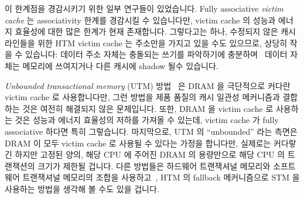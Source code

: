 이 한계점을 경감시키기 위한 일부 연구들이 있었습니다.
Fully associative \emph{victim cache} 는 associativity 한계를 경감시킬 수
있습니다만, victim cache 의 성능과 에너지 효율성에 대한 많은 한계가 현재
존재합니다.
그렇다고는 하나, 수정되지 않은 캐시 라인들을 위한 HTM victim cache 는 주소만을
가지고 있을 수도 있으므로, 상당히 작을 수 있습니다:
데이터 주소 자체는 충돌되는 쓰기를 파악하기에 충분하며~\cite{RaviRajwar2012TSX}
데이터 자체는 메모리에 쓰여지거나 다른 캐시에 shadow 될수 있습니다.
\iffalse

Although cache associativity varies, the eight-way associativity of
the level-0 cache on the laptop I am typing this on is not unusual.
What this means is that if a given transaction needed to touch
nine cache lines, and if all nine cache lines mapped to the same
set, then that transaction cannot possibly complete, never mind how
many megabytes of additional space might be available in that cache.
Yes, given randomly selected data elements in a given data structure,
the probability of that transaction being able to commit is quite
high, but there can be no guarantee.

There has been some research work to alleviate this limitation.
Fully associative \emph{victim caches} would alleviate the associativity
constraints, but there are currently stringent performance and
energy-efficiency constraints on the sizes of victim caches.
That said, HTM victim caches for unmodified cache lines can be quite
small, as they need to retain only the address:
The data itself can be written to memory or shadowed by other caches,
while the address itself is sufficient to detect a conflicting
write~\cite{RaviRajwar2012TSX}.
\fi

\emph{Unbounded transactional memory} (UTM)
방법~\cite{CScottAnanian2006,KevinEMoore2006} 은 DRAM 을 극단적으로 커다란
victim cache 로 사용합니다만, 그런 방법을 제품 품질의 캐시 일관성 메커니즘과
결합하는 것은 여전히 해결되지 않은 문제입니다.
또한, DRAM 을 victim cache 로 사용하는 것은 성능과 에너지 효율성의 저하를
가져올 수 있는데, victim cache 가 fully associative 하다면 특히 그렇습니다.
마지막으로, UTM 의 ``unbounded'' 라는 측면은 DRAM 이 모두 victim cache 로
사용될 수 있다는 가정을 합니다만, 실제로는 커다랗긴 하지만 고정된 양의, 해당
CPU 에 주어진 DRAM 의 용량만으로 해당 CPU 의 트랜잭션의 크기가 제한될 겁니다.
다른 방법들은 하드웨어 트랜잭셔널 메모리와 소프트웨어 트랜잭셔널 메모리의
조합을 사용하고~\cite{SanjeevKumar2006}, HTM 의 fallback 메커니즘으로 STM 을
사용하는 방법을 생각해 볼 수도 있을 겁니다.


